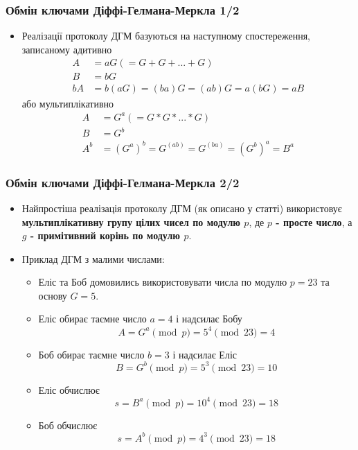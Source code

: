 \documentclass{beamer}
\begin{document}
\begin{frame}
  \frametitle{Обмін ключами Діффі-Гелмана-Меркла 1/2}
  \begin{itemize}
  \item Реалізації протоколу ДГМ базуються на наступному спостереження,
    записаному адитивно
    \begin{align*}
      A &= aG (= G + G + ... + G) \\
      B &= bG \\
      bA &= b(aG) = (ba)G = (ab)G = a(bG) = aB
    \end{align*}
    або мультиплікативно
    \begin{align*}
      A &= G^a (= G * G * ... * G) \\
      B &= G^b \\
      A^b &= (G^a)^b = G^{(ab)} = G^{(ba)} = (G^b)^a = B^a
    \end{align*}
  \end{itemize}
\end{frame}

\begin{frame}
  \frametitle{Обмін ключами Діффі-Гелмана-Меркла 2/2}
  \begin{itemize}
  \item Найпростіша реалізація протоколу ДГМ (як описано у статті)
    використовує \textbf{мультиплікативну групу цілих чисел по модулю $p$}, де
    \textbf{$p$ - просте число}, а \textbf{ $g$ - примітивний корінь по модулю $p$}.
  \item Приклад ДГМ з малими числами:
    \begin{itemize}
      \scriptsize
    \item Еліс та Боб домовились використовувати числа по модулю $p = 23$ та
      основу $G = 5$.
    \item Еліс обирає таємне число $a = 4$ і надсилає Бобу
        $$A = G^a \pmod{p} = 5^4 \pmod{23} = 4$$
    \item Боб обирає таємне число $b = 3$ і надсилає Еліс
      $$B = G^b \pmod{p} = 5^3 \pmod{23} = 10$$
    \item Еліс обчислює
      $$s = B^a \pmod{p} = 10^4 \pmod{23} = 18$$
    \item Боб обчислює
      $$s = A^b \pmod{p} = 4^3 \pmod{23} = 18$$
    \end{itemize}
  \end{itemize}
\end{frame}
\end{document}
